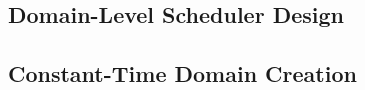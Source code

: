 \subsection{Domain-Level Scheduler Design}
\label{sub:domain_design}


\subsection{Constant-Time Domain Creation}
\label{sub:constant_time_creation}


